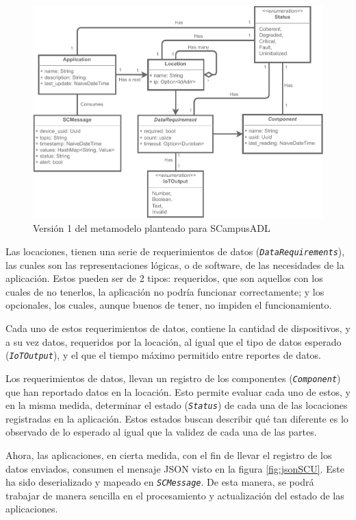 \begin{figure}[ht]
    \caption{Versión 1 del metamodelo planteado para SCampusADL}
    \label{fig:metamodelo}
    \vspace{2mm}
    \includegraphics[width=\linewidth]{images/Metamodel B.pdf}
\end{figure}

Las locaciones, tienen una serie de requerimientos de datos (\texttt{\textit{DataRequirements}}), las cuales son las representaciones lógicas, o de software, de las necesidades de la aplicación. Estos pueden ser de 2 tipos: requeridos, que son aquellos con los cuales de no tenerlos, la aplicación no podría funcionar correctamente; y los opcionales, los cuales, aunque buenos de tener, no impiden el funcionamiento.

Cada uno de estos requerimientos de datos, contiene la cantidad de dispositivos, y a su vez datos, requeridos por la locación, al igual que el tipo de datos esperado (\textit{\texttt{IoTOutput}}), y el que el tiempo máximo permitido entre reportes de datos. 

Los requerimientos de datos, llevan un registro de los componentes (\textit{\texttt{Component}}) que han reportado datos en la locación. Esto permite evaluar cada uno de estos, y en la misma medida, determinar el estado (\textit{\texttt{Status}}) de cada una de las locaciones registradas en la aplicación. Estos estados buscan describir qué tan diferente es lo observado de lo esperado al igual que la validez de cada una de las partes. 

Ahora, las aplicaciones, en cierta medida, con el fin de llevar el registro de los datos enviados, consumen el mensaje JSON visto en la figura \ref{fig:jsonSCU}. Este ha sido deserializado y mapeado en \textit{\texttt{SCMessage}}. De esta manera, se podrá trabajar de manera sencilla en el procesamiento y actualización del estado de las aplicaciones.

